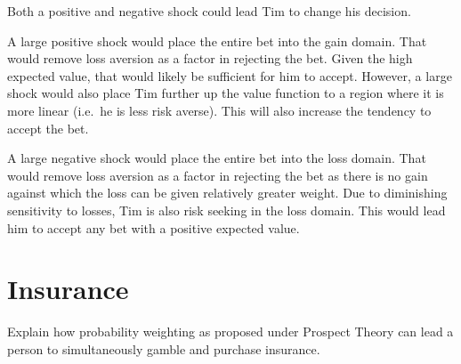 \documentclass[
  letterpaper,
  DIV=11,
  numbers=noendperiod]{scrreprt}
\begin{document}
\begin{tcolorbox}[enhanced jigsaw, title=\textcolor{quarto-callout-tip-color}{\faLightbulb}\hspace{0.5em}{Answer}, toprule=.15mm, colback=white, breakable, titlerule=0mm, colframe=quarto-callout-tip-color-frame, coltitle=black, opacityback=0, rightrule=.15mm, colbacktitle=quarto-callout-tip-color!10!white, bottomtitle=1mm, opacitybacktitle=0.6, arc=.35mm, bottomrule=.15mm, toptitle=1mm, leftrule=.75mm, left=2mm]

Both a positive and negative shock could lead Tim to change his
decision.

A large positive shock would place the entire bet into the gain domain.
That would remove loss aversion as a factor in rejecting the bet. Given
the high expected value, that would likely be sufficient for him to
accept. However, a large shock would also place Tim further up the value
function to a region where it is more linear (i.e.~he is less risk
averse). This will also increase the tendency to accept the bet.

A large negative shock would place the entire bet into the loss domain.
That would remove loss aversion as a factor in rejecting the bet as
there is no gain against which the loss can be given relatively greater
weight. Due to diminishing sensitivity to losses, Tim is also risk
seeking in the loss domain. This would lead him to accept any bet with a
positive expected value.

\end{tcolorbox}

\hypertarget{insurance-1}{%
\section{Insurance}\label{insurance-1}}

Explain how probability weighting as proposed under Prospect Theory can
lead a person to simultaneously gamble and purchase insurance.
\end{document}
